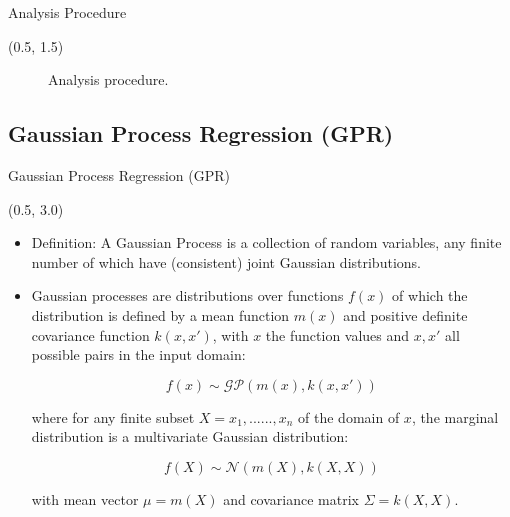 \documentclass[11pt, xcolor={dvipsnames}, aspectratio = 169]{beamer}
\begin{document}
\begin{frame}{Analysis Procedure}

\begin{textblock}{14.0}(0.5, 1.5)

\begin{figure}
    \centering
    
    \caption{Analysis procedure.}
\end{figure}

\end{textblock}

\end{frame}


%
%

\subsection{Gaussian Process Regression (GPR)}

\begin{frame}[fragile]{Gaussian Process Regression (GPR)}

\begin{textblock}{14.0}(0.5, 3.0)

\begin{itemize}

\item Definition: A Gaussian Process is a collection of random variables, any finite number of which have (consistent) joint Gaussian distributions.

\item Gaussian processes are distributions over functions $f(x)$ of which the distribution is defined by a mean function $m(x)$ and positive definite covariance function $k(x, x')$, with $x$ the function values and $x, x'$ all possible pairs in the input domain:

\begin{equation*}
    f(x) \sim \mathcal{G}\mathcal{P}(m(x), k(x, x'))
\end{equation*}

where for any finite subset $X = {x_{1}, ......, x_{n}}$ of the domain of $x$, the marginal distribution is a multivariate Gaussian distribution:

\begin{equation*}
f(X) \sim \mathcal{N}(m(X), k(X, X))
\end{equation*}

with mean vector $\mu = m(X)$ and covariance matrix $\Sigma = k(X, X)$.

\end{itemize}

\end{textblock}

\end{frame}
\end{document}
